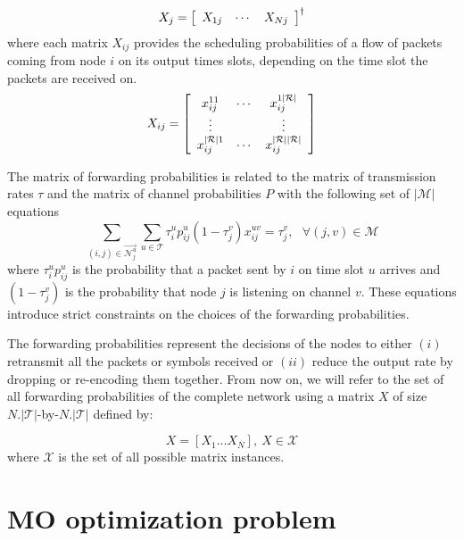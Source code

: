 \documentclass[a4paper]{article}
\newcommand{\T}{\mathcal{T}}
\newcommand{\M}{\mathcal{M}}
\newcommand{\X}{\mathcal{X}}
\newcommand{\R}{\mathcal{R}}
\newcommand{\Nout}[2]{ \overrightarrow{ \mathcal{N}_{#1}^{#2} } }
\begin{document}
\[
X_j = \left[ 
 	\begin{array}{c c c}
		X_{1j} &
		\cdots &
		X_{Nj} \\
 	\end{array}
\right]^{\dagger}
\]
where each matrix  $X_{ij}$ provides the scheduling probabilities of a flow of packets coming from node $i$ on its output times slots, depending on the time slot the packets are received on.
\[ 
 X_{ij} = \left[ 
 	\begin{array}{c c c}
		x_{ij}^{11} 	& \cdots & x_{ij}^{1|\R|}\\
		\vdots 	 	& 		&	\vdots	\\
		x_{ij}^{|\R|1} 	& \cdots & x_{ij}^{|\R||\R|}\\
 	\end{array}
\right] 
\]

The matrix of forwarding probabilities is related to the matrix of transmission rates $\tau$ and the matrix of channel probabilities $P$ with the following set of $|\M|$ equations
\begin{equation}
\sum_{(i,j) \in \Nout{j}{u}} \sum_{u \in \T}  \tau_i^u p_{ij}^u (1-\tau_j^v) x_{ij}^{uv} =  \tau_j^v, ~~~\forall (j,v)\in \M
\label{eq:fwfprobaflowconservation}
\end{equation}
\noindent where $\tau_i^u p_{ij}^u$ is the probability that a packet sent by $i$ on time slot $u$ arrives and $ (1-\tau_j^v)$ is the probability that node $j$ is listening on channel $v$. These equations introduce strict constraints on the choices of the forwarding probabilities. 

The forwarding probabilities represent the decisions of the nodes to either $(i)$ retransmit all the packets or symbols received or $(ii)$ reduce the output rate by dropping or re-encoding them together. 
From now on, we will refer to the set of all forwarding probabilities of the complete network using a matrix $X$ of size $N.|\T|$-by-$N.|\T|$ defined by:

\begin{equation}
X = \left[ X_1 \dots X_N \right],~ X \in \X 
\label{eq:xmatrix}
\end{equation}
\noindent where $\X$ is the set of all possible matrix instances.







\section{MO optimization problem}\label{sec:problemstatement}
\end{document}
